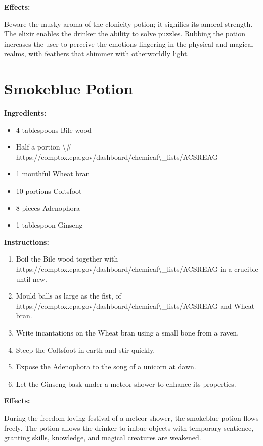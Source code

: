 \documentclass{article}
\begin{document}
\textbf{Effects:}

Beware the musky aroma of the clonicity potion; it signifies its amoral strength. The elixir enables the drinker the ability to solve puzzles. Rubbing the potion increases the user to perceive the emotions lingering in the physical and magical realms, with feathers that shimmer with otherworldly light.

\newpage
\section*{Smokeblue Potion}

\textbf{Ingredients:}

\begin{itemize}
  \item 4 tablespoons Bile wood
  \item Half a portion \textbackslash{}# https://comptox.epa.gov/dashboard/chemical\textbackslash{}_lists/ACSREAG
  \item 1 mouthful Wheat bran
  \item 10 portions Coltsfoot
  \item 8 pieces Adenophora
  \item 1 tablespoon Ginseng
\end{itemize}

\textbf{Instructions:}

\begin{enumerate}
  \item Boil the Bile wood together with  https://comptox.epa.gov/dashboard/chemical\textbackslash{}_lists/ACSREAG in a crucible until new.
  \item Mould balls as large as the fist, of  https://comptox.epa.gov/dashboard/chemical\textbackslash{}_lists/ACSREAG and Wheat bran.
  \item Write incantations on the Wheat bran using a small bone from a raven.
  \item Steep the Coltsfoot in earth and stir quickly.
  \item Expose the Adenophora to the song of a unicorn at dawn.
  \item Let the Ginseng bask under a meteor shower to enhance its properties.
\end{enumerate}

\textbf{Effects:}

During the freedom-loving festival of a meteor shower, the smokeblue potion flows freely. The potion allows the drinker to imbue objects with temporary sentience, granting skills, knowledge, and magical creatures are weakened.
\end{document}

